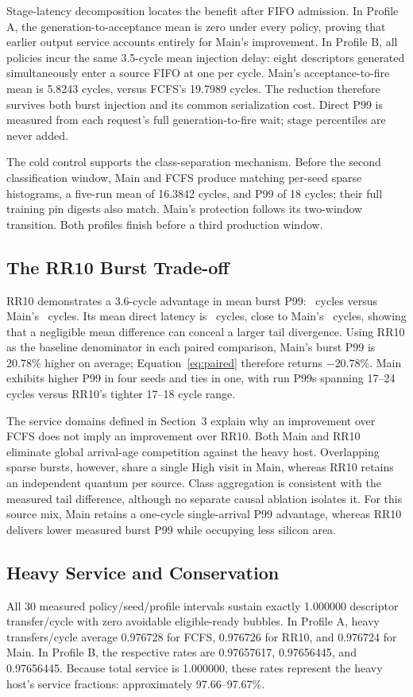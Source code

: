 Stage-latency decomposition locates the benefit after FIFO admission. In Profile A,
the generation-to-acceptance mean is zero under every policy, proving that earlier output
service accounts entirely for Main's improvement. In Profile B, all policies incur the same
3.5-cycle mean injection delay: eight descriptors generated simultaneously enter a
source FIFO at one per cycle. Main's acceptance-to-fire mean is 5.8243 cycles,
versus FCFS's 19.7989 cycles. The reduction therefore survives both burst injection
and its common serialization cost. Direct P99 is measured from each request's
full generation-to-fire wait; stage percentiles are never added.

The cold control supports the class-separation mechanism. Before the second
classification window, Main and FCFS produce matching per-seed sparse
histograms, a five-run mean of 16.3842 cycles, and P99 of 18 cycles; their full
training pin digests also match. Main's protection follows its two-window
transition. Both profiles finish before a third production window.

\subsection{The RR10 Burst Trade-off}
RR10 demonstrates a 3.6-cycle advantage in mean burst P99: \HSPtailBRR\ cycles versus
Main's \HSPtailBMain\ cycles. Its mean direct latency is \HSMeanBRR\ cycles, close
to Main's \HSMeanBMain\ cycles, showing that a negligible mean difference can conceal a larger tail
divergence. Using RR10 as the baseline denominator in each paired comparison, Main's
burst P99 is 20.78\% higher on average; Equation~\ref{eq:paired} therefore
returns $-20.78\%$. Main exhibits higher P99 in four seeds and ties in one, with
run P99s spanning 17--24 cycles versus RR10's tighter 17--18 cycle range.

The service domains defined in Section~3 explain why an improvement over FCFS does
not imply an improvement over RR10. Both Main and RR10 eliminate global
arrival-age competition against the heavy host. Overlapping sparse bursts,
however, share a single High visit in Main, whereas RR10 retains an independent quantum per source.
Class aggregation is consistent with the measured tail difference, although
no separate causal ablation isolates it. For this source mix, Main retains
a one-cycle single-arrival P99 advantage, whereas RR10 delivers lower measured
burst P99 while occupying less silicon area.

\subsection{Heavy Service and Conservation}
All 30 measured policy/seed/profile intervals sustain exactly 1.000000
descriptor transfer/cycle with zero avoidable eligible-ready bubbles. In Profile A,
heavy transfers/cycle average 0.976728 for FCFS, 0.976726 for RR10, and 0.976724
for Main. In Profile B, the respective rates are 0.97657617, 0.97656445, and
0.97656445. Because total service is 1.000000, these rates represent the heavy
host's service fractions: approximately 97.66--97.67\%.

